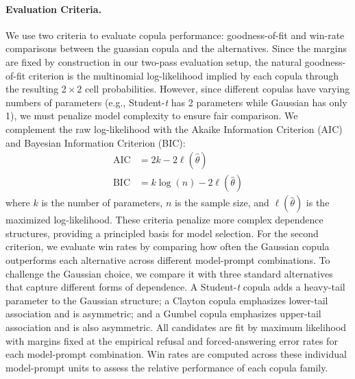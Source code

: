 \documentclass{article} %
\theoremstyle{definition}
\begin{document}
\paragraph{Evaluation Criteria.}
We use two criteria to evaluate copula performance: goodness-of-fit and win-rate comparisons between the guassian copula and the alternatives.
Since the margins are fixed by construction in our two-pass evaluation setup, the natural goodness-of-fit criterion is the multinomial log-likelihood implied by each copula through the resulting 2\,$\times$\,2 cell probabilities. However, since different copulas have varying numbers of parameters (e.g., Student-\emph{t} has 2 parameters while Gaussian has only 1), we must penalize model complexity to ensure fair comparison. We complement the raw log-likelihood with the Akaike Information Criterion (AIC) and Bayesian Information Criterion (BIC):
\begin{align}
\text{AIC} &= 2k - 2\ell(\hat{\theta})\\
\text{BIC} &= k\log(n) - 2\ell(\hat{\theta})
\end{align}
where $k$ is the number of parameters, $n$ is the sample size, and $\ell(\hat{\theta})$ is the maximized log-likelihood. These criteria penalize more complex dependence structures, providing a principled basis for model selection\textbf{}.
For the second criterion, we evaluate win rates by comparing how often the Gaussian copula outperforms each alternative across different model-prompt combinations. 
To challenge the Gaussian choice, we compare it with three standard alternatives that capture different forms of dependence. A Student-\emph{t} copula adds a heavy-tail parameter to the Gaussian structure; a Clayton copula emphasizes lower-tail association and is asymmetric; and a Gumbel copula emphasizes upper-tail association and is also asymmetric. All candidates are fit by maximum likelihood with margins fixed at the empirical refusal and forced-answering error rates for each model-prompt combination. Win rates are computed across these individual model-prompt units to assess the relative performance of each copula family.
\end{document}
